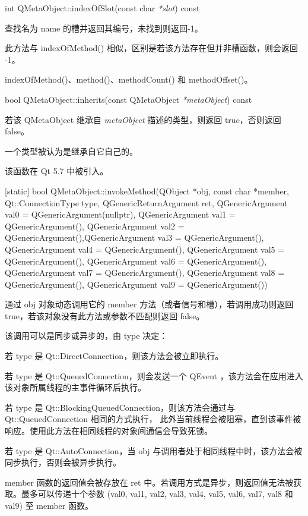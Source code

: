 int QMetaObject::indexOfSlot(const char \emph{*slot}) const

查找名为 name 的槽并返回其编号，未找到则返回-1。

此方法与 indexOfMethod() 相似，区别是若该方法存在但并非槽函数，则会返回 -1。

\begin{notice}[另请参阅]
indexOfMethod()、method()、methodCount() 和 methodOffset()。
\end{notice}


bool QMetaObject::inherits(const QMetaObject \emph{*metaObject}) const

若该 QMetaObject 继承自 \emph{metaObject} 描述的类型，则返回 true，否则返回 false。

一个类型被认为是继承自它自己的。

该函数在 Qt 5.7 中被引入。

[static] bool QMetaObject::invokeMethod(QObject *obj, const char *member, 
 Qt::ConnectionType type, QGenericReturnArgument ret, 
 QGenericArgument val0 = QGenericArgument(nullptr), QGenericArgument val1 = QGenericArgument(), 
 QGenericArgument val2 = QGenericArgument(),QGenericArgument val3 = QGenericArgument(), 
 QGenericArgument val4 = QGenericArgument(), QGenericArgument val5 = QGenericArgument(), 
 QGenericArgument val6 = QGenericArgument(), QGenericArgument val7 = QGenericArgument(), 
 QGenericArgument val8 = QGenericArgument(), QGenericArgument val9 = QGenericArgument())

通过 obj 对象动态调用它的 member 方法（或者信号和槽），若调用成功则返回 true，若该对象没有此方法或参数不匹配则返回 false。

该调用可以是同步或异步的，由 type 决定：

\begin{compactitem}
\item 若 type 是 Qt::DirectConnection，则该方法会被立即执行。
\item 若 type 是 Qt::QueuedConnection，则会发送一个 QEvent ，该方法会在应用进入该对象所属线程的主事件循环后执行。
\item 若 type 是 Qt::BlockingQueuedConnection，则该方法会通过与 Qt::QueuedConnection 相同的方式执行，
	此外当前线程会被阻塞，直到该事件被响应。使用此方法在相同线程的对象间通信会导致死锁。
\item 若 type 是 Qt::AutoConnection，当 obj 与调用者处于相同线程中时，该方法会被同步执行，否则会被异步执行。
\end{compactitem}

member 函数的返回值会被存放在 ret 中。若调用方式是异步，则返回值无法被获取。最多可以传递十个参数 (val0, val1, val2, val3, val4, val5, val6, val7, val8 和 val9) 至 member 函数。

